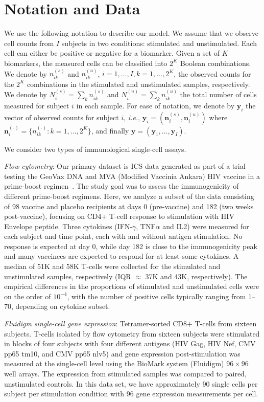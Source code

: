 \documentclass[12pt,oupdraft]{biostatistics}
\begin{document}
\section{Notation and Data}
\label{s:data}

We use the following notation to describe our model.  We assume that we observe cell counts from $I$ subjects in two conditions: stimulated and unstimulated. Each cell can either be positive or negative for a biomarker. Given a set of $K$ biomarkers, the measured cells can be classified into $2^K$ Boolean combinations. We denote by $n^{(s)}_{ik}$ and $n^{(u)}_{ik}$, $i=1,\dots,I,k=1,\dots, 2^K$, the observed counts for the $2^K$ combinations in the stimulated and unstimulated samples, respectively. We denote by $N^{(s)}_{i}=\sum_k n^{(s)}_{ik}$ and $N^{(u)}_{i}=\sum_k n^{(u)}_{ik}$ the total number of cells measured for subject $i$ in each sample. For ease of notation, we denote by $\mathbf{y}_i$ the vector of observed counts for subject $i$, \textit{i.e.}, $\mathbf{y}_{i}=(\mathbf{n}^{(s)}_{i}, \mathbf{n}^{(u)}_{i})$ where $\mathbf{n}^{(\cdot)}_{i}=\{n^{(\cdot)}_{ik}: k=1,\dots,2^K\}$, and finally $\mathbf{y}=(\mathbf{y}_1,\dots,\mathbf{y}_I)$.

We consider two types of immunological single-cell assays.

\noindent\textit{Flow cytometry}:
Our primary dataset is ICS data generated as part of a  trial testing the GeoVax DNA and MVA (Modified Vaccinia Ankara) HIV vaccine in a prime-boost regimen~\citep{Goepfert:2011ci}.
The study goal was to assess the immunogenicity of different prime-boost regimens.
Here, we analyze a subset of the data consisting of 98 vaccine and placebo recipients at days 0 (pre-vaccine) and 182 (two weeks post-vaccine), focusing on CD4+ T-cell response to stimulation with HIV Envelope peptide.
Three cytokines (IFN-$\gamma$, TNF$\alpha$ and IL2) were measured for each subject and time point, each with and without antigen stimulation. No response is expected at day 0, while day 182 is close to the immunogenicity peak and many vaccinees are expected to respond for at least some cytokines. A median of 51K and 58K T-cells were collected for the stimulated and unstimulated samples, respectively (IQR $\approx$ 37K and 43K, respectively). The empirical differences in the proportions of stimulated and unstimulated cells were on the order of $10^{-4}$, with the number of positive cells typically ranging from 1--70, depending on cytokine subset. 

\noindent\textit{Fluidigm single-cell gene expression}: Tetramer-sorted CD8$+$ T-cells from sixteen subjects. T-cells isolated by flow cytometry from sixteen subjects were stimulated in blocks of four subjects with four different antigens (HIV Gag, HIV Nef, CMV pp65 tm10, and CMV pp65 nlv5) and gene expression post-stimulation was measured at the single-cell level using the BioMark system (Fluidigm) $96 \times 96$ well arrays. The expression from stimulated samples  was compared to paired, unstimulated controls. In this data set, we have approximately 90 single cells per subject per stimulation condition with 96 gene expression measurements per cell.
\end{document}
